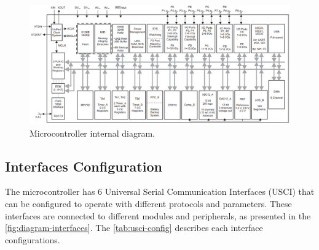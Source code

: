 \begin{figure}[!ht]
    \begin{center}
        \includegraphics[width=\textwidth]{figures/msp430-diagram.png}
        \caption{Microcontroller internal diagram.}
        \label{fig:msp430-diagram}
    \end{center}
\end{figure}

\subsection{Interfaces Configuration}

The microcontroller has 6 Universal Serial Communication Interfaces (USCI) that can be configured to operate with different protocols and parameters. These interfaces are connected to different modules and peripherals, as presented in the \autoref{fig:diagram-interfaces}. The \autoref{tab:usci-config} describes each interface configurations.


